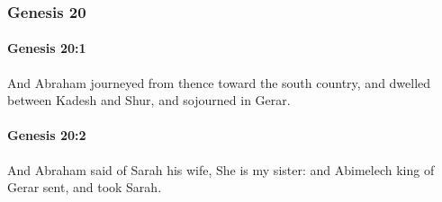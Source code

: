 	\subsubsection{Genesis 20} %
		\label{GENESIS-20}

		\paragraph{Genesis 20:1} %
			\label{GENESIS-20-1}

			And Abraham journeyed from thence toward the south country, and dwelled between Kadesh and Shur, and sojourned in Gerar.


		\paragraph{Genesis 20:2} %
			\label{GENESIS-20-2}

			And Abraham said of Sarah his wife, She is my sister: and Abimelech king of Gerar sent, and took Sarah.


